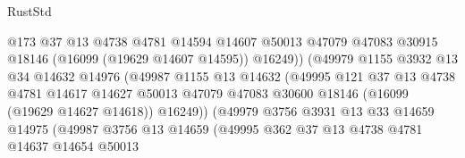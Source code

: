 \begin{lexlean}{RustStd}
\begin{coremodule}
                                    @173
                                    @37
                                    @13
                                    @4738
                                    @4781
                                    @14594
                                    @14607
                                    @50013
                                    @47079
                                    @47083
                                    @30915
                                    @18146
                                    (@16099 (@19629 @14607 @14595))
                                    @16249))
                                (@49979
                                  @1155
                                  @3932
                                  @13
                                  @34
                                  @14632
                                  @14976
                                  (@49987
                                    @1155
                                    @13
                                    @14632
                                    (@49995
                                      @121
                                      @37
                                      @13
                                      @4738
                                      @4781
                                      @14617
                                      @14627
                                      @50013
                                      @47079
                                      @47083
                                      @30600
                                      @18146
                                      (@16099 (@19629 @14627 @14618))
                                      @16249))
                                  (@49979
                                    @3756
                                    @3931
                                    @13
                                    @33
                                    @14659
                                    @14975
                                    (@49987
                                      @3756
                                      @13
                                      @14659
                                      (@49995
                                        @362
                                        @37
                                        @13
                                        @4738
                                        @4781
                                        @14637
                                        @14654
                                        @50013

\end{coremodule}
\end{lexlean}
